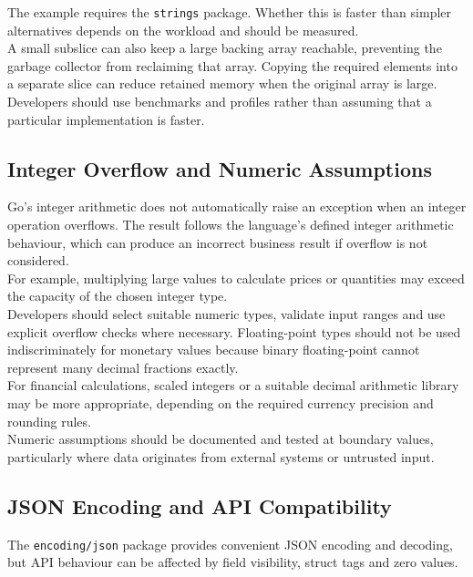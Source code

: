 The example requires the \texttt{strings} package. Whether this is faster than simpler alternatives depends on the workload and should be measured.\\

A small subslice can also keep a large backing array reachable, preventing the garbage collector from reclaiming that array. Copying the required elements into a separate slice can reduce retained memory when the original array is large.\\

Developers should use benchmarks and profiles rather than assuming that a particular implementation is faster.

\subsection{Integer Overflow and Numeric Assumptions}

Go's integer arithmetic does not automatically raise an exception when an integer operation overflows. The result follows the language's defined integer arithmetic behaviour, which can produce an incorrect business result if overflow is not considered.\\

For example, multiplying large values to calculate prices or quantities may exceed the capacity of the chosen integer type.\\

Developers should select suitable numeric types, validate input ranges and use explicit overflow checks where necessary. Floating-point types should not be used indiscriminately for monetary values because binary floating-point cannot represent many decimal fractions exactly.\\

For financial calculations, scaled integers or a suitable decimal arithmetic library may be more appropriate, depending on the required currency precision and rounding rules.\\

Numeric assumptions should be documented and tested at boundary values, particularly where data originates from external systems or untrusted input.

\subsection{JSON Encoding and API Compatibility}

The \texttt{encoding/json} package provides convenient JSON encoding and decoding, but API behaviour can be affected by field visibility, struct tags and zero values.

